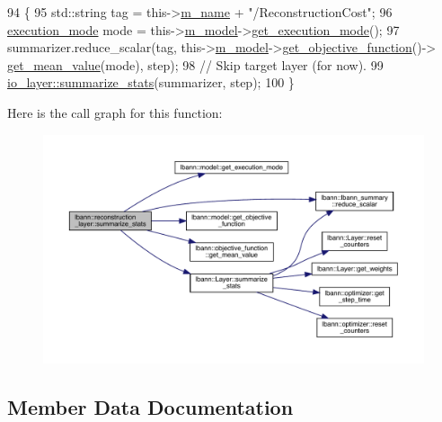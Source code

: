 \begin{DoxyCode}
94                                                                      \{
95     std::string tag = this->\hyperlink{classlbann_1_1Layer_aa47109ad09b399142fa92f9d3702189f}{m\_name} + \textcolor{stringliteral}{"/ReconstructionCost"};
96     \hyperlink{base_8hpp_a2781a159088df64ed7d47cc91c4dc0a8}{execution\_mode} mode = this->\hyperlink{classlbann_1_1Layer_a3d9315e99574166f2f33e37b572021d2}{m\_model}->\hyperlink{classlbann_1_1model_addb40597cf29aa6d31b6a7d09ef48608}{get\_execution\_mode}();
97     summarizer.reduce\_scalar(tag, this->\hyperlink{classlbann_1_1Layer_a3d9315e99574166f2f33e37b572021d2}{m\_model}->\hyperlink{classlbann_1_1model_aee5530467523924a662dec891b9a7993}{get\_objective\_function}()->
      \hyperlink{classlbann_1_1objective__function_a0aa271e497363e97ba3741292961d47d}{get\_mean\_value}(mode), step);
98     \textcolor{comment}{// Skip target layer (for now).}
99     \hyperlink{classlbann_1_1Layer_a7f3f26e2ae0497f9a00fd6bc56b50543}{io\_layer::summarize\_stats}(summarizer, step);
100   \}
\end{DoxyCode}
Here is the call graph for this function\+:\nopagebreak
\begin{figure}[H]
\begin{center}
\leavevmode
\includegraphics[width=350pt]{classlbann_1_1reconstruction__layer_a09bf00610af66810bf8bbb65424d1e1a_cgraph}
\end{center}
\end{figure}


\subsection{Member Data Documentation}
\mbox{\label{classlbann_1_1reconstruction__layer_a077a29792de2a39015da8b18120a00e3}} 
